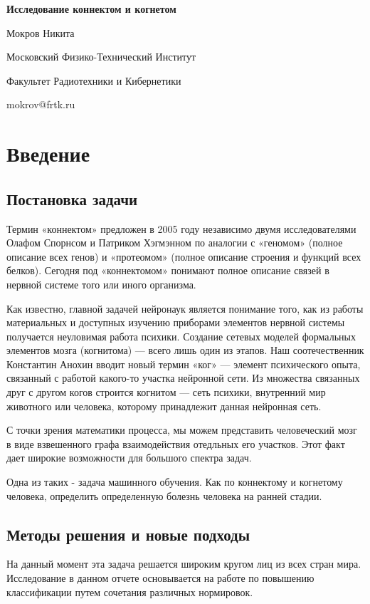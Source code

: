 \documentclass{urticle}
\begin{document}
\begin{center}
{\LARGE \textbf{Исследование коннектом и когнетом}}

{\Large Мокров Никита}

{\large Московский Физико-Технический Институт}

{\large Факультет Радиотехники и Кибернетики}

{\large mokrov@frtk.ru}
\end{center}

\section*{Введение}
\subsection*{Постановка задачи}
Термин «коннектом» предложен в 2005 году независимо двумя исследователями Олафом Спорнсом и Патриком Хэгмэнном по аналогии с «геномом» (полное описание всех генов) и «протеомом» (полное описание строения и функций всех белков). Сегодня под «коннектомом» понимают полное описание связей в нервной системе того или иного организма.

Как известно, главной задачей нейронаук является понимание того, как из работы материальных и доступных изучению приборами элементов нервной системы получается неуловимая работа психики. Создание сетевых моделей формальных элементов мозга (когнитома) — всего лишь один из этапов. Наш соотечественник Константин Анохин вводит новый термин «ког» — элемент психического опыта, связанный с работой какого-то участка нейронной сети. Из множества связанных друг с другом когов строится когнитом — сеть психики, внутренний мир животного или человека, которому принадлежит данная нейронная сеть.

С точки зрения математики процесса, мы можем представить человеческий мозг в виде взвешенного графа взаимодействия отедльных его участков. Этот факт дает широкие возможности для большого спектра задач. 

Одна из таких - задача машинного обучения. Как по коннектому и когнетому человека, определить определенную болезнь человека на ранней стадии.

\subsection*{Методы решения и новые подходы}
На данный момент эта задача решается широким кругом лиц из всех стран мира. Исследование в данном отчете основывается на работе по повышению классификации путем сочетания различных нормировок\cite{article1}\cite{article2}.
\end{document}
